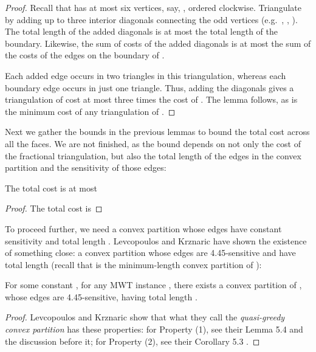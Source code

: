 \documentclass[final]{siamltex}
\begin{document}
\begin{proof}
  Recall that  has at most six vertices,
  say, , ordered clockwise.
  Triangulate  by adding up to three
  interior diagonals connecting the odd vertices
  (e.g.~, , ).
  The total length of the added diagonals
  is at most the total length of the boundary.
  Likewise, the sum of costs of the added diagonals
  is at most the sum of the costs of the edges on the boundary of .

  Each added edge occurs in two triangles in this triangulation,
  whereas each boundary edge occurs in just one triangle.
  Thus, adding the diagonals gives a triangulation of cost
  at most three times the cost of .
  The lemma follows, as  is the minimum cost
  of any triangulation of .
\end{proof}

Next we gather the bounds in the previous lemmas 
to bound the total cost across all the faces.
We are not finished, 
as the bound depends on not only the cost of the fractional triangulation,
but also the total length of the edges in the convex partition 
and the sensitivity  of those edges:

\begin{lemma}\label{bound}
  The total cost  is at most
  

\end{lemma}

\begin{proof}
The total cost is

\end{proof}

To proceed further,
we need a convex partition whose edges have constant sensitivity
and total length .
Levcopoulos and Krznaric have shown the existence 
of something close: a convex partition  whose edges are 4.45-sensitive
and have total length 
(recall that  is the minimum-length convex partition of ):

\begin{lemma}\label{lemma:LK}
  For some constant , for any MWT instance ,
  there exists a convex partition  of ,
  whose edges are 4.45-sensitive,
  having total length .
\end{lemma}

\begin{proof}
  Levcopoulos and Krznaric 
  show that what they call the {\em quasi-greedy convex partition}
  has these properties:
  for Property (1), see their Lemma 5.4 and the discussion before it;
  for Property (2), see their Corollary 5.3   \cite{krznaric1998quasi}.
\end{proof}
\end{document}
